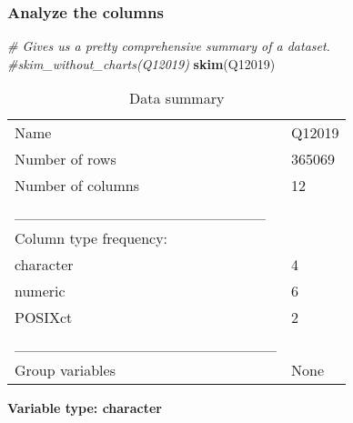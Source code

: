 \documentclass[
]{article}
\newenvironment{Shaded}{\begin{snugshade}}{\end{snugshade}}
\newcommand{\CommentTok}[1]{\textcolor[rgb]{0.56,0.35,0.01}{\textit{#1}}}
\newcommand{\FunctionTok}[1]{\textcolor[rgb]{0.13,0.29,0.53}{\textbf{#1}}}
\newcommand{\NormalTok}[1]{#1}
\begin{document}
\hypertarget{analyze-the-columns}{%
\subsubsection{Analyze the columns}\label{analyze-the-columns}}

\begin{Shaded}
\begin{Highlighting}[]
\CommentTok{\# Gives us a pretty comprehensive summary of a dataset.}
\CommentTok{\#skim\_without\_charts(Q12019)}
\FunctionTok{skim}\NormalTok{(Q12019)}
\end{Highlighting}
\end{Shaded}

\begin{longtable}[]{@{}ll@{}}
\caption{Data summary}\tabularnewline
\toprule\noalign{}
\endfirsthead
\endhead
\bottomrule\noalign{}
\endlastfoot
Name & Q12019 \\
Number of rows & 365069 \\
Number of columns & 12 \\
\_\_\_\_\_\_\_\_\_\_\_\_\_\_\_\_\_\_\_\_\_\_\_ & \\
Column type frequency: & \\
character & 4 \\
numeric & 6 \\
POSIXct & 2 \\
\_\_\_\_\_\_\_\_\_\_\_\_\_\_\_\_\_\_\_\_\_\_\_\_ & \\
Group variables & None \\
\end{longtable}

\textbf{Variable type: character}
\end{document}

